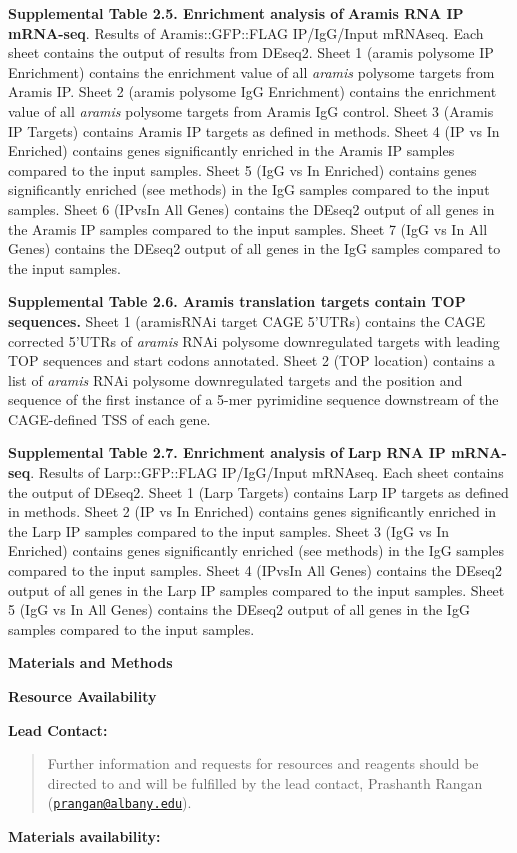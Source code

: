 \documentclass[12pt,twoside]{reedthesis}
\begin{document}
\textbf{Supplemental Table 2.5. Enrichment analysis of} \textbf{Aramis RNA IP
mRNA-seq}. Results of Aramis::GFP::FLAG IP/IgG/Input mRNAseq. Each
sheet contains the output of results from DEseq2. Sheet 1 (aramis
polysome IP Enrichment) contains the enrichment value of all \emph{aramis}
polysome targets from Aramis IP. Sheet 2 (aramis polysome IgG
Enrichment) contains the enrichment value of all \emph{aramis} polysome
targets from Aramis IgG control. Sheet 3 (Aramis IP Targets) contains
Aramis IP targets as defined in methods. Sheet 4 (IP vs In Enriched)
contains genes significantly enriched in the Aramis IP samples compared
to the input samples. Sheet 5 (IgG vs In Enriched) contains genes
significantly enriched (see methods) in the IgG samples compared to the
input samples. Sheet 6 (IPvsIn All Genes) contains the DEseq2 output of
all genes in the Aramis IP samples compared to the input samples. Sheet
7 (IgG vs In All Genes) contains the DEseq2 output of all genes in the
IgG samples compared to the input samples.

\textbf{Supplemental Table 2.6. Aramis translation targets contain TOP
sequences.} Sheet 1 (aramisRNAi target CAGE 5'UTRs) contains the CAGE
corrected 5'UTRs of \emph{aramis} RNAi polysome downregulated targets with
leading TOP sequences and start codons annotated. Sheet 2 (TOP location)
contains a list of \emph{aramis} RNAi polysome downregulated targets and the
position and sequence of the first instance of a 5-mer pyrimidine
sequence downstream of the CAGE-defined TSS of each gene.

\textbf{Supplemental Table 2.7. Enrichment analysis of} \textbf{Larp RNA IP
mRNA-seq}. Results of Larp::GFP::FLAG IP/IgG/Input mRNAseq. Each sheet
contains the output of DEseq2. Sheet 1 (Larp Targets) contains Larp IP
targets as defined in methods. Sheet 2 (IP vs In Enriched) contains
genes significantly enriched in the Larp IP samples compared to the
input samples. Sheet 3 (IgG vs In Enriched) contains genes significantly
enriched (see methods) in the IgG samples compared to the input samples.
Sheet 4 (IPvsIn All Genes) contains the DEseq2 output of all genes in
the Larp IP samples compared to the input samples. Sheet 5 (IgG vs In
All Genes) contains the DEseq2 output of all genes in the IgG samples
compared to the input samples.

\textbf{Materials and Methods}

\textbf{{Resource Availability}}

\textbf{Lead Contact:}
\begin{quote}
Further information and requests for resources and reagents should be
directed to and will be fulfilled by the lead contact, Prashanth
Rangan (\href{mailto:prangan@albany.edu}{\nolinkurl{prangan@albany.edu}}).
\end{quote}
\textbf{Materials availability:}
\end{document}
